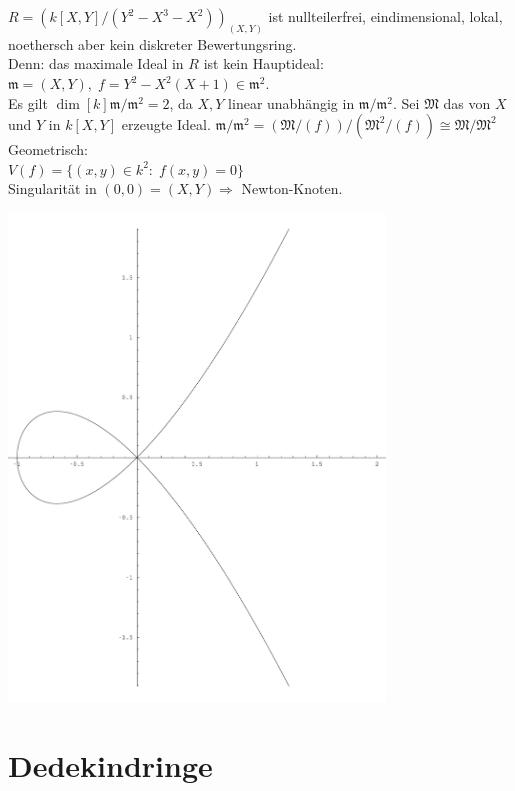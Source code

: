 \documentclass[a4paper, 10pt]{report}
\begin{document}
\begin{nnBsp}
$R = (k[X,Y]/(Y^2-X^3-X^2))_{(X,Y)}$ ist nullteilerfrei, eindimensional, lokal, noethersch aber kein diskreter Bewertungsring.\\
Denn: das maximale Ideal in $R$ ist kein Hauptideal: $\mathfrak{m}=(X,Y), \; f = Y^2-X^2(X+1) \in \mathfrak{m}^2$.\\
Es gilt $\dim[k]{\mathfrak{m}/\mathfrak{m}^2} = 2$, da $X,Y$ linear unabhängig in $\mathfrak{m}/\mathfrak{m}^2$.
Sei $\mathfrak{M}$ das von $X$ und $Y$ in $k[X,Y]$ erzeugte Ideal.
$\mathfrak{m}/\mathfrak{m}^2 = (\mathfrak{M}/(f))/(\mathfrak{M}^2/(f)) \cong \mathfrak{M}/\mathfrak{M}^2$\\
Geometrisch:\\
$V(f) = \{(x,y) \in k^2: \; f(x,y) = 0\}$\\
Singularität in $(0,0) = (X,Y) \Rightarrow$ \glqq Newton-Knoten\grqq.
\begin{center}
	\includegraphics[width=0.75\textwidth]{images/algebra2/newtonknoten.pdf}
\end{center}
\end{nnBsp}

\section{Dedekindringe}
\end{document}
